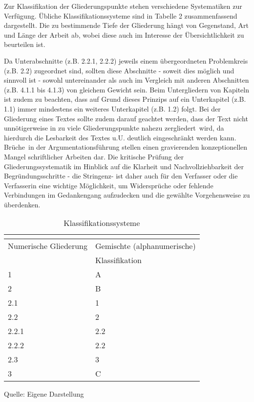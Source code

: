 \documentclass[a4paper, 12pt]{article}
\renewcommand{\arraystretch}{1.0}
\begin{document}
Zur Klassifikation der Gliederungspunkte stehen verschiedene Systematiken zur
Verf\"{u}gung. \"{U}bliche Klassifikationssysteme sind in Tabelle 2 zusammenfassend
dargestellt. Die zu bestimmende Tiefe der Gliederung h\"{a}ngt von Gegenstand, Art und
L\"{a}nge der Arbeit ab, wobei diese auch im Interesse der \"{U}bersichtlichkeit zu
beurteilen ist.

Da Unterabschnitte (z.B. 2.2.1, 2.2.2) jeweils einem \"{u}bergeordneten Problemkreis
(z.B. 2.2) zugeordnet sind, sollten diese Abschnitte - soweit dies m\"{o}glich und
sinnvoll ist - sowohl untereinander als auch im Vergleich mit anderen Abschnitten
(z.B. 4.1.1 bis 4.1.3) von gleichem Gewicht sein. Beim Untergliedern von Kapiteln
ist zudem zu beachten, dass auf Grund dieses Prinzips auf ein Unterkapitel (z.B.
1.1) immer mindestens ein weiteres Unterkapitel (z.B. 1.2) folgt. Bei der Gliederung
eines Textes sollte zudem darauf geachtet werden, dass der Text nicht unn\"{o}tigerweise
in zu viele Gliederungspunkte nahezu \glqq zergliedert\grqq\ wird, da hierdurch die
Lesbarkeit des Textes u.U. deutlich eingeschr\"{a}nkt werden kann. \glqq Br\"{u}che\grqq\ in
der Argumentationsf\"{u}hrung stellen einen gravierenden konzeptionellen Mangel
schriftlicher Arbeiten dar. Die kritische Pr\"{u}fung der Gliederungssystematik im
Hinblick auf die Klarheit und Nachvollziehbarkeit der Begr\"{u}ndungsschritte - die
\glqq Stringenz\grqq - ist daher auch f\"{u}r den Verfasser oder die Verfasserin eine
wichtige M\"{o}glichkeit, um Widerspr\"{u}che oder fehlende Verbindungen im Gedankengang
aufzudecken und die gew\"{a}hlte Vorgehensweise zu \"{u}berdenken.

\begin{center}
\begin{table}[h] \centering
\renewcommand{\arraystretch}{1.3}
\begin{tabular}{|l|l|}
\multicolumn{1}{c}{\hspace{5cm}} & \multicolumn{1}{c}{\hspace{5cm}} \\ \hline
\multicolumn{1}{|c|}{Numerische Gliederung} & \multicolumn{1}{c|}{Gemischte (alphanumerische)} \\
\multicolumn{1}{|c|}{} & \multicolumn{1}{|l|}{Klassifikation} \\
\hline 1 & A\\ \hline 2 & B \\ \hline 2.1 & 1 \\ \hline 2.2 & 2 \\ \hline 2.2.1 &
2.2 \\ \hline 2.2.2 & 2.2 \\ \hline 2.3 & 3 \\ \hline 3 & C \\ \hline
\end{tabular}
\singlespacing \caption{Klassifikationssysteme}\label{Klassifikation} {Quelle:
Eigene Darstellung}
\renewcommand{\arraystretch}{1.3}
\onehalfspacing
\end{table}
\end{center}
\end{document}
